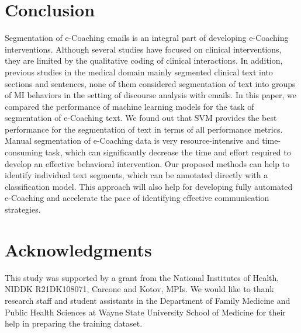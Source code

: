 \documentclass{amia}
\begin{document}
\section*{Conclusion}
Segmentation of e-Coaching emails is an integral part of developing e-Coaching interventions. Although several studies have focused on clinical interventions, they are limited by the qualitative coding of clinical interactions. In addition, previous studies in the medical domain mainly segmented clinical text into sections and sentences, none of them considered segmentation of text into groups of MI behaviors in the setting of discourse analysis with emails. In this paper, we compared the performance of machine learning models for the task of segmentation of e-Coaching text. We found out that SVM provides the best performance for the segmentation of text in terms of all performance metrics. Manual segmentation of e-Coaching data is very resource-intensive and time-consuming task, which can significantly decrease the time and effort required to develop an effective behavioral intervention. Our proposed methods can help to identify individual text segments, which can be annotated directly with a classification model. This approach will also help for developing fully automated e-Coaching and accelerate the pace of identifying effective communication strategies.

\section*{Acknowledgments}
This study was supported by a grant from the National Institutes of Health, NIDDK R21DK108071, Carcone and Kotov, MPIs. We would like to thank research staff and student assistants in the Department of Family Medicine and Public Health Sciences at Wayne State University School of Medicine for their help in preparing the training dataset. 



\end{document}
